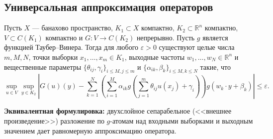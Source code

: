 \documentclass[../NDCNNAI_main.tex]{subfiles}
\begin{document}
\subsection{Универсальная аппроксимация операторов}
\begin{theorem}
    \label{thm:chen_chen_oper}
    Пусть \( X \) --- банахово пространство, \( K_1 \subset X \) компактно, \( K_2 \subset \mathbb{R}^n \) компактно, \( V \subset C(K_1) \) компактно и \( G \colon V \to C(K_2) \) непрерывно. Пусть \( g \) является функцией Таубер–Винера. Тогда для любого \( \varepsilon > 0 \) существуют целые числа \( m, M, N \), точки выборки \( x_1, \ldots, x_m \in K_1 \), выходные частоты \( w_1, \ldots, w_N \in \mathbb{R}^n \) и вещественные параметры \( \{\theta_{ij}, \gamma_i\}_{i \leq M, j \leq m} \) и \( \{\alpha_{ik}, \beta_k\}_{i \leq M, k \leq N} \) такие, что
\[
\sup_{u \in V} \sup_{y \in K_2} \left| G(u)(y) - \sum_{k=1}^{N} \left( \sum_{i=1}^{M} \alpha_{ik} g \left( \sum_{j=1}^{m} \theta_{ij} u(x_j) + \gamma_i \right) \right) g(w_k \cdot y + \beta_k) \right| \leq \varepsilon.
\]
\end{theorem}

\textbf{Эквивалентная формулировка:} двухслойное сепарабельное (<<внешнее произведение>>) разложение по \( g \)-атомам над входными выборками и выходным значением дает равномерную аппроксимацию оператора.
\end{document}

